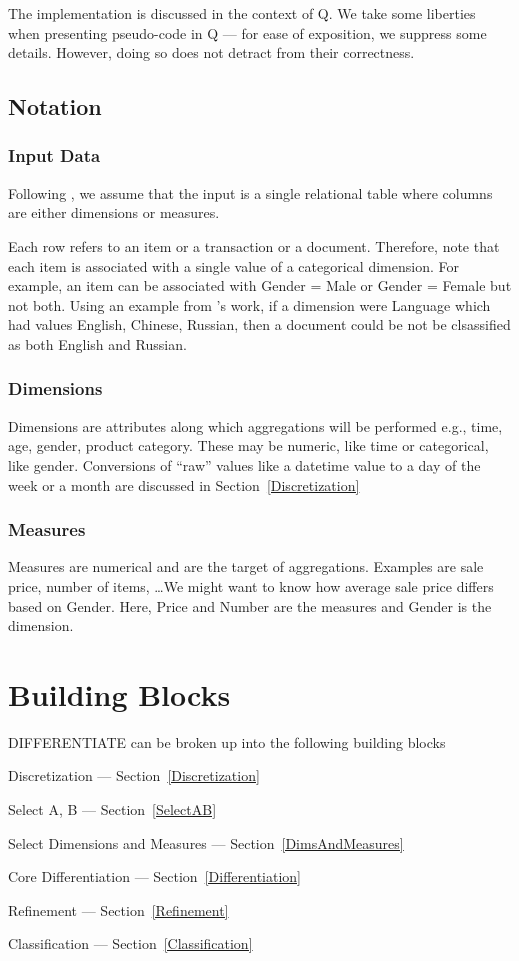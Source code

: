 The implementation is discussed in the context of Q. We take some liberties when
presenting pseudo-code in Q --- for ease of exposition, we suppress some
details. However, doing so does not detract from their correctness.


\subsection{Notation}
\subsubsection{Input Data}
Following \cite{Fagin05}, we assume that the input is a 
single relational
table where columns are either dimensions or measures. 

Each row refers to an item or a transaction or a document. 
Therefore, note that each item is associated with a single value of a
categorical dimension. For example, an item can be associated with Gender = Male
or Gender = Female but not both.
Using an example from \cite{Fagin05}'s work, if a dimension were Language which had 
values English, Chinese, Russian, then a document could be not be clsassified as
both English and Russian.


\subsubsection{Dimensions}
Dimensions are
attributes along which aggregations will be performed e.g., time, age,
gender, product category. These may be numeric, like time or
categorical, like gender.
Conversions of ``raw'' values like a datetime value to a day of the week or a
month are discussed in Section~\ref{Discretization}

\subsubsection{Measures}
Measures are numerical and are the target of aggregations. Examples are sale
price, number of items, \ldots We might want to know how average sale price
differs based on Gender. Here, Price and Number are the measures and Gender is
the dimension.

\section{Building Blocks}
DIFFERENTIATE can be broken up into the following building blocks
\be
\item Discretization --- Section~\ref{Discretization}
\item Select A, B  --- Section~\ref{SelectAB}
\item Select Dimensions and Measures --- Section~\ref{DimsAndMeasures}
\item Core Differentiation  --- Section~\ref{Differentiation}
\item Refinement --- Section~\ref{Refinement}
\item Classification --- Section~\ref{Classification}
\ee


